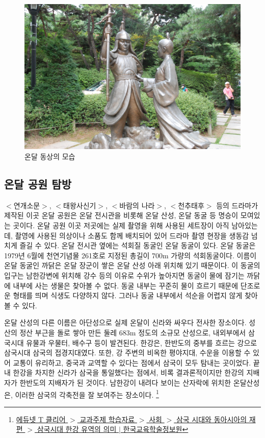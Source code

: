 \begin{figure}
    \centering
    \includegraphics[width=.6\textwidth]{s_img/온달_사진.jpg}
    \caption{온달 동상의 모습}
    \label{fig:my_label_s4}
 \end{figure}

\subsection{온달 공원 탐방}
$<$연개소문$>$, $<$태왕사신기$>$, $<$바람의 나라$>$, $<$천추태후$>$ 등의 드라마가 제작된 이곳 온달 공원은 
온달 전시관을 비롯해 온달 산성, 온달 동굴 등 명승이 모여있는 곳이다. 
온달 공원 이곳 저곳에는 실제 촬영을 위해 사용된 세트장이 아직 남아있는데, 촬영에 사용된 의상이나 소품도 함께 배치되어 있어 
드라마 촬영 현장을 생동감 넘치게 즐길 수 있다. 
온달 전시관 옆에는 석회질 동굴인 온달 동굴이 있다. 
온달 동굴은 1979년 6월에 천연기념물 261호로 지정된 총길이 700m 가량의 석회동굴이다. 
이름이 온달 동굴인 까닭은 온달 장군이 쌓은 온달 산성 아래 위치해 있기 때문이다. 
이 동굴의 입구는 남한강변에 위치해 강수 등의 이유로 수위가 높아지면 동굴이 물에 잠기는 까닭에 내부에 사는 생물은 찾아볼 수 없다. 
동굴 내부는 꾸준히 물이 흐르기 때문에 단조로운 형태를 띄며 식생도 다양하지 않다. 
그러나 동굴 내부에서 석순을 어렵지 않게 찾아볼 수 있다. 


온달 산성의 다른 이름은 아단성으로 실제 온달이 신라와 싸우다 전사한 장소이다. 
성산의 정산 부근을 돌로 쌓아 만든 둘레 683m 정도의 소규모 산성으로, 
내외부에서 삼국시대 유물과 우물터, 배수구 등이 발견된다. 
한강은, 한반도의 중부를 흐르는 강으로 삼국시대 삼국의 접경지대였다. 
또한, 강 주변의 비옥한 평야지대, 수운을 이용할 수 있어 교통이 유리하고, 중국과 교역할 수 있다는 점에서 삼국이 모두 탐내는 곳이었다.
끝내 한강을 차지한 신라가 삼국을 통일했다는 점에서, 비록 결과론적이지만
한강의 지배자가 한반도의 지배자가 된 것이다.
남한강이 내려다 보이는 산자락에 위치한 온달산성은, 
이러한 삼국의 각축전을 잘 보여주는 장소이다.
\footnote{\href{https://www.edunet.net/nedu/contsvc/viewWkstCont.do?clss_id=CLSS0000000362&menu_id=81&contents_id=1d7c0c64-bc0f-45e7-8f4d-82a7bb00cc97&svc_clss_id=CLSS0000072410&contents_openapi=naverdic}
{에듀넷 T 클리어 $>$ 교과주제 학습자료 $>$ 사회 $>$ 삼국 시대와 동아시아의 재편 $>$ 삼국시대 한강 유역의 의미 $|$ 한국교육학술정보원}}




